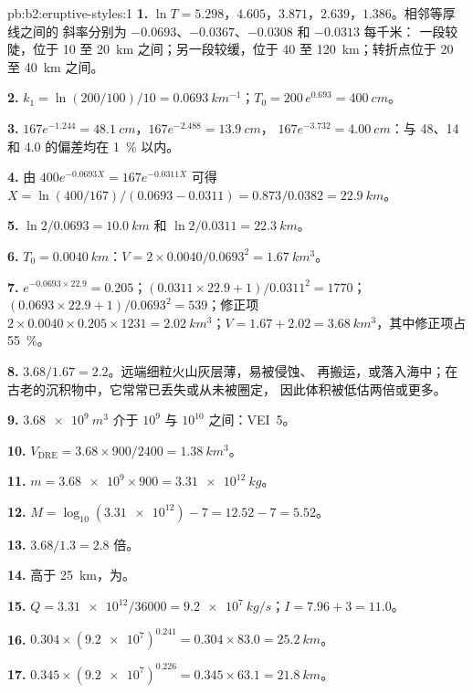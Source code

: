 \begin{solution}{pb:b2:eruptive-styles:1}
\textbf{1.} $\ln T = 5.298$，$4.605$，$3.871$，$2.639$，$1.386$。相邻等厚线之间的
斜率分别为 $-0.0693$、$-0.0367$、$-0.0308$ 和 $-0.0313$ 每千米：
一段较陡，位于 10 至 \qty{20}{km} 之间；另一段较缓，位于 40 至
\qty{120}{km}；转折点位于 20 至 \qty{40}{km} 之间。

\textbf{2.} $k_1 = \ln(200/100)/10 = \qty{0.0693}{km^{-1}}$；$T_0 = 200\,e^{0.693} =
\qty{400}{cm}$。

\textbf{3.} $167e^{-1.244} = \qty{48.1}{cm}$，$167e^{-2.488} = \qty{13.9}{cm}$，
$167e^{-3.732} = \qty{4.00}{cm}$：与 48、14 和 4.0 的偏差均在 \qty{1}{\percent} 以内。

\textbf{4.} 由 $400e^{-0.0693X} = 167e^{-0.0311X}$ 可得 $X = \ln(400/167)/(0.0693 -
0.0311) = 0.873/0.0382 = \qty{22.9}{km}$。

\textbf{5.} $\ln2/0.0693 = \qty{10.0}{km}$ 和 $\ln2/0.0311 = \qty{22.3}{km}$。

\textbf{6.} $T_0 = \qty{0.0040}{km}$：$V = 2\times0.0040/0.0693^2 =
\qty{1.67}{km^3}$。

\textbf{7.} $e^{-0.0693\times22.9} = 0.205$；$(0.0311\times22.9 + 1)/0.0311^2 = 1770$；
$(0.0693\times22.9 + 1)/0.0693^2 = 539$；修正项 $2\times0.0040\times0.205\times1231 =
\qty{2.02}{km^3}$；$V = 1.67 + 2.02 = \qty{3.68}{km^3}$，其中修正项占
\qty{55}{\percent}。

\textbf{8.} $3.68/1.67 = 2.2$。远端细粒火山灰层薄，易被侵蚀、
再搬运，或落入海中；在古老的沉积物中，它常常已丢失或从未被圈定，
因此体积被低估两倍或更多。

\textbf{9.} $\qty{3.68e9}{m^3}$ 介于 $10^9$ 与 $10^{10}$ 之间：VEI~5。

\textbf{10.} $V_{\mathrm{DRE}} = 3.68\times900/2400 = \qty{1.38}{km^3}$。

\textbf{11.} $m = \num{3.68e9}\times900 = \qty{3.31e12}{kg}$。

\textbf{12.} $M = \log_{10}(\num{3.31e12}) - 7 = 12.52 - 7 = 5.52$。

\textbf{13.} $3.68/1.3 = 2.8$ 倍。

\textbf{14.} 高于 \qty{25}{km}，为。

\textbf{15.} $Q = \num{3.31e12}/36000 = \qty{9.2e7}{kg/s}$；$I = 7.96 + 3 = 11.0$。

\textbf{16.} $0.304\times(\num{9.2e7})^{0.241} = 0.304\times83.0 = \qty{25.2}{km}$。

\textbf{17.} $0.345\times(\num{9.2e7})^{0.226} = 0.345\times63.1 = \qty{21.8}{km}$。


\end{solution}
